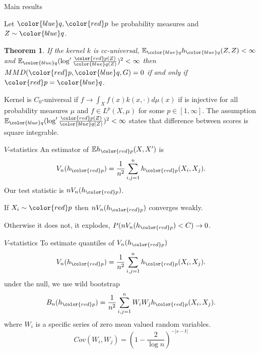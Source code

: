 \documentclass{beamer}
\newtheorem{thm}{Theorem}
\begin{document}
\begin{frame}{Main results}

Let ${ \color{blue} q},{\color{red} p}$ be probability measures and $Z\sim { \color{blue} q}$. 
\begin{thm}
 If the kernel $k$ is cc-universal, $\ev_{{ \color{blue} q}} h_{{ \color{blue} q}}(Z,Z)<\infty$ and $\ev_{{ \color{blue} q}} (\log' \frac{{\color{red} p}(Z)}{{ \color{blue} q}(Z)})^{2}<\infty$
then $MMD({\color{red} p},{ \color{blue} q},G) =0$ if and only if ${\color{red} p}={ \color{blue} q}$.
\end{thm}
\small{
Kernel is $C_0$-universal if  $f \to \int_X f(x) k(x,\cdot) d\mu(x)$ if is injective for all probability measures $\mu$ and  $f \in L^p(X,\mu)$ for some $p \in [1,\infty] $. The assumption $\ev_{{ \color{blue} q}} (\log' \frac{{\color{red} p}(Z)}{{ \color{blue} q}(Z)})^{2}<\infty$ states that difference between scores is square integrable. 
}

\end{frame} 


 
 \begin{frame}{$V$-statistics}
An estimator of $\ev h_{\color{red} p}(X,X')$ is
\[
 V_n(h_{\color{red} p}) = \frac {1} {n^2} \sum_{i,j=1}^n h_{\color{red} p}(X_i,X_j).
\]
Our test statistic is $ n V_n(h_{\color{red} p})$.

If $X_i \sim {\color{red} p}$ then $ n V_n(h_{\color{red} p})$  converges weakly. 

Otherwise it does not,  it explodes, $P(n V_n(h_{\color{red} p}) <C) \to 0$.
 \end{frame}
 
 
  \begin{frame}{$V$-statistics}
To estimate quantiles of $ V_n(h_{\color{red} p})$  
\[
 V_n(h_{\color{red} p}) = \frac {1} {n^2} \sum_{i,j=1}^n h_{\color{red} p}(X_i,X_j).
\]
under the null, we use wild bootstrap
\[
 B_n(h_{\color{red} p}) = \frac {1} {n^2} \sum_{i,j=1}^n W_i W_j h_{\color{red} p}(X_i,X_j).
\]
  where $W_i$ is a specific series of zero mean valued random variables.
  $$
  Cov(W_i,W_j) = (1-\frac{2}{\log n})^{-|s-t|}
  $$
\end{frame}
\end{document}
